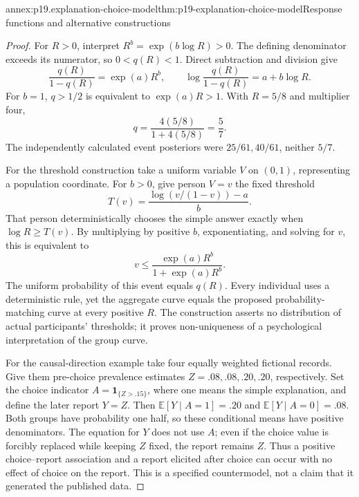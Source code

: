 \begin{annexitem}{annex:p19.explanation-choice-model}{thm:p19-explanation-choice-model}{Response functions and alternative constructions}
\begin{proof}
For \(R>0\), interpret \(R^b=\exp(b\log R)>0\).
The defining denominator exceeds its numerator, so
\(0<q(R)<1\). Direct subtraction and division give
\[
 \frac{q(R)}{1-q(R)}=\exp(a)R^b,
 \qquad \log\frac{q(R)}{1-q(R)}=a+b\log R.
\]
For \(b=1\), \(q>1/2\) is equivalent to
\(\exp(a)R>1\). With \(R=5/8\) and multiplier four,
\[
 q=\frac{4(5/8)}{1+4(5/8)}=\frac57.
\]
The independently calculated event posteriors were
\(25/61,40/61\), neither \(5/7\).

For the threshold construction take a uniform variable
\(V\) on \((0,1)\), representing a population coordinate.
For \(b>0\), give person \(V=v\) the fixed threshold
\[
 T(v)=\frac{\log(v/(1-v))-a}{b}.
\]
That person deterministically chooses the simple answer
exactly when \(\log R\geq T(v)\). By multiplying by
positive \(b\), exponentiating, and solving for \(v\),
this is equivalent to
\[
 v\leq \frac{\exp(a)R^b}{1+\exp(a)R^b}.
\]
The uniform probability of this event equals \(q(R)\).
Every individual uses a deterministic rule, yet the
aggregate curve equals the proposed probability-matching
curve at every positive \(R\).
The construction asserts no distribution of actual
participants' thresholds; it proves non-uniqueness
of a psychological interpretation of the group curve.

For the causal-direction example take four equally weighted
fictional records. Give them pre-choice prevalence estimates
\(Z=.08,.08,.20,.20\), respectively. Set the choice indicator
\(A=\mathbf1_{\{Z>.15\}}\), where one means the simple
explanation, and define the later report \(Y=Z\).
Then \(\mathbb E[Y\mid A=1]=.20\) and
\(\mathbb E[Y\mid A=0]=.08\).
Both groups have probability one half, so these conditional
means have positive denominators.
The equation for \(Y\) does not use \(A\); even if the
choice value is forcibly replaced while keeping \(Z\)
fixed, the report remains \(Z\).
Thus a positive choice--report association and a report
elicited after choice can occur with no effect of choice
on the report. This is a specified countermodel, not
a claim that it generated the published data.
\end{proof}
\end{annexitem}

